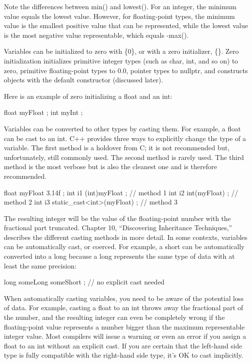 Note the differences between min() and lowest(). For an integer, the minimum value equals the lowest value. However, for floating-point types, the minimum value is the smallest positive value that can be represented, while the lowest value is the most negative value representable, which equals -max().


Variables can be initialized to zero with \{0\}, or with a zero initializer, \{\}. Zero initialization initializes primitive integer types (such as char, int, and so on) to zero, primitive floating-point types to 0.0, pointer types to nullptr, and constructs objects with the default constructor (discussed later).

Here is an example of zero initializing a float and an int:

\begin{cpp}
float myFloat {};
int myInt {};
\end{cpp}


Variables can be converted to other types by casting them. For example, a float can be cast to an int. C++ provides three ways to explicitly change the type of a variable. The first method is a holdover from C; it is not recommended but, unfortunately, still commonly used. The second method is rarely used. The third method is the most verbose but is also the cleanest one and is therefore recommended.

\begin{cpp}
float myFloat { 3.14f };
int i1 { (int)myFloat }; // method 1
int i2 { int(myFloat) }; // method 2
int i3 { static_cast<int>(myFloat) }; // method 3
\end{cpp}

The resulting integer will be the value of the floating-point number with the fractional part truncated. Chapter 10, “Discovering Inheritance Techniques,” describes the different casting methods in more detail. In some contexts, variables can be automatically cast, or coerced. For example, a short can be automatically converted into a long because a long represents the same type of data with at least the same precision:

\begin{cpp}
long someLong { someShort }; // no explicit cast needed
\end{cpp}

When automatically casting variables, you need to be aware of the potential loss of data. For example, casting a float to an int throws away the fractional part of the number, and the resulting integer can even be completely wrong if the floating-point value represents a number bigger than the maximum representable integer value. Most compilers will issue a warning or even an error if you assign a float to an int without an explicit cast. If you are certain that the left-hand side type is fully compatible with the right-hand side type, it’s OK to cast implicitly.

